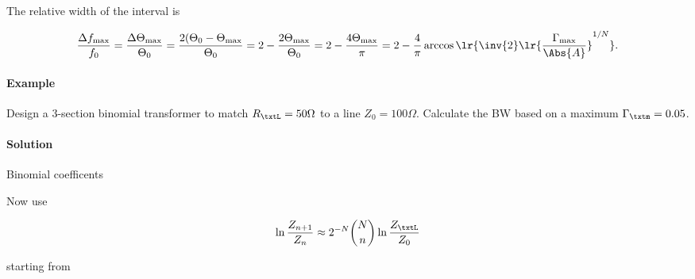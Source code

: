 The relative width of the interval is

\begin{dmath}\label{eqn:uwavesDeck7MultisectionTransformersCore:440}
\frac{\Delta f_{\mathrm{max}}}{f_0}
=
\frac{\Delta \Theta_{\mathrm{max}}}{\Theta_0}
=
\frac{2 (\Theta_0 - \Theta_{\mathrm{max}}}{\Theta_0}
=
2 - \frac{2 \Theta_{\mathrm{max}}}{\Theta_0}
=
2 - \frac{4 \Theta_{\mathrm{max}}}{\pi}
=
2 - \frac{4 }{\pi} \arccos\lr{ \inv{2} \lr{ \frac{\Gamma_{\mathrm{max}}}{\Abs{A}}}^{1/N} }.
\end{dmath}

\paragraph{Example}

Design a 3-section binomial transformer to match \( R_\txtL = 50 \Omega \) to a line \( Z_0 = 100 \Omega \).  Calculate the BW based on a maximum \( \Gamma_\txtm = 0.05 \).

\paragraph{Solution}

Binomial coefficents

Now use 

\begin{equation}\label{eqn:uwavesDeck7MultisectionTransformersCore:460}
\ln \frac{Z_{n+1}}{Z_n} \approx 2^{-N} \binom{N}{n} \ln \frac{Z_\txtL}{Z_0}
\end{equation}

starting from 

